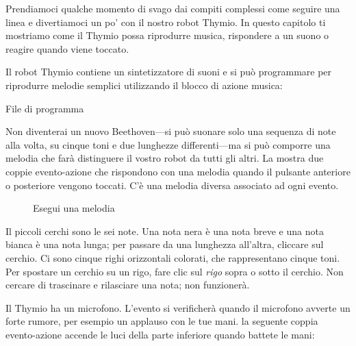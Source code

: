 
\label{ch.bells}

Prendiamoci qualche momento di svago dai compiti complessi come seguire una linea e
divertiamoci un po' con il nostro robot Thymio.
In questo capitolo ti mostriamo come il Thymio possa riprodurre musica, rispondere a un suono o reagire quando viene toccato.


Il robot Thymio contiene un sintetizzatore di suoni e si può programmare
per riprodurre melodie semplici utilizzando il blocco di azione musica: 

{\raggedleft \hfill File di programma }

Non diventerai un nuovo Beethoven---si può suonare solo una sequenza di note alla volta,
su cinque toni e due lunghezze differenti---ma si può comporre una
melodia che farà distinguere il vostro robot da tutti gli altri. La  mostra
due coppie evento-azione che rispondono con una melodia quando il pulsante anteriore o posteriore
vengono toccati. C'è una melodia diversa associato ad ogni evento.

\begin{figure}
\begin{center}
\caption{Esegui una melodia}\label{fig.music}
\end{center}
\end{figure}

Il piccoli cerchi sono le sei note.
Una nota nera è una nota breve e una nota bianca è una nota lunga; per passare da una lunghezza all'altra, cliccare sul cerchio.
Ci sono cinque righi orizzontali colorati, che rappresentano cinque toni.
Per spostare un cerchio su un rigo, fare clic sul \emph{rigo} sopra o sotto il cerchio.
Non cercare di trascinare e rilasciare una nota; non funzionerà.




Il Thymio ha un microfono. L'evento  si verificherà
quando il microfono avverte un forte rumore, per esempio un applauso con le tue
mani. la seguente coppia evento-azione accende le luci della parte inferiore
quando battete le mani: 

